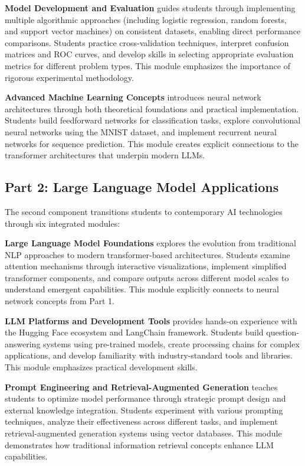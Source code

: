 \documentclass{article}
\begin{document}
\textbf{Model Development and Evaluation} guides students through implementing multiple algorithmic approaches (including logistic regression, random forests, and support vector machines) on consistent datasets, enabling direct performance comparisons. Students practice cross-validation techniques, interpret confusion matrices and ROC curves, and develop skills in selecting appropriate evaluation metrics for different problem types. This module emphasizes the importance of rigorous experimental methodology.

\textbf{Advanced Machine Learning Concepts} introduces neural network architectures through both theoretical foundations and practical implementation. Students build feedforward networks for classification tasks, explore convolutional neural networks using the MNIST dataset, and implement recurrent neural networks for sequence prediction. This module creates explicit connections to the transformer architectures that underpin modern LLMs.

\subsection{Part 2: Large Language Model Applications}

The second component transitions students to contemporary AI technologies through six integrated modules:

\textbf{Large Language Model Foundations} explores the evolution from traditional NLP approaches to modern transformer-based architectures. Students examine attention mechanisms through interactive visualizations, implement simplified transformer components, and compare outputs across different model scales to understand emergent capabilities. This module explicitly connects to neural network concepts from Part 1.

\textbf{LLM Platforms and Development Tools} provides hands-on experience with the Hugging Face ecosystem and LangChain framework. Students build question-answering systems using pre-trained models, create processing chains for complex applications, and develop familiarity with industry-standard tools and libraries. This module emphasizes practical development skills.

\textbf{Prompt Engineering and Retrieval-Augmented Generation} teaches students to optimize model performance through strategic prompt design and external knowledge integration. Students experiment with various prompting techniques, analyze their effectiveness across different tasks, and implement retrieval-augmented generation systems using vector databases. This module demonstrates how traditional information retrieval concepts enhance LLM capabilities.
\end{document}
